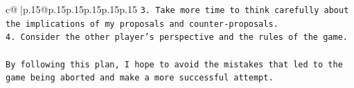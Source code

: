 \documentclass{article}
\begin{document}
{\begin{supertabular}{c@{$\;$}|p{.15\linewidth}@{}p{.15\linewidth}p{.15\linewidth}p{.15\linewidth}p{.15\linewidth}p{.15\linewidth}}
{{{\texttt{3. Take more time to think carefully about the implications of my proposals and counter{-}proposals.} \\
\texttt{4. Consider the other player's perspective and the rules of the game.} \\
\\ 
\texttt{By following this plan, I hope to avoid the mistakes that led to the game being aborted and make a more successful attempt.} \\
            }
        }
    }
     \\ \\

\end{supertabular}
}
\end{document}

